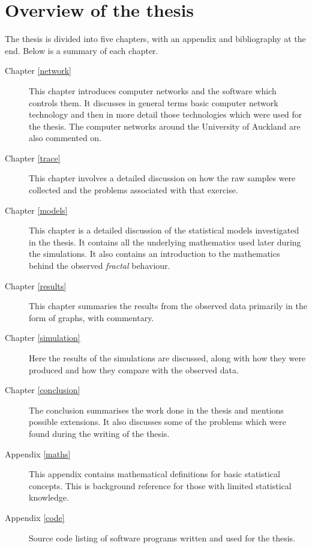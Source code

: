 \chapter{Overview of the thesis}

The thesis is divided into five chapters, with an appendix and
bibliography at the end.  Below is a summary of each chapter.

\begin{description}
\item[Chapter \ref{network}]
This chapter introduces computer networks and the software which
controls them.  It discusses in general terms basic computer network
technology and then in more detail those technologies which were used
for the thesis.  The computer networks around the University of
Auckland are also commented on.

\item[Chapter \ref{trace}]
This chapter involves a detailed discussion on how the raw samples
were collected and the problems associated with that exercise.

\item[Chapter \ref{models}]
This chapter is a detailed discussion of the statistical models
investigated in the thesis.  It contains all the underlying
mathematics used later during the simulations.  It also contains an
introduction to the mathematics behind the observed \emph{fractal}
behaviour.

\item[Chapter \ref{results}]
This chapter summaries the results from the observed data primarily in
the form of graphs, with commentary.

\item[Chapter \ref{simulation}]
Here the results of the simulations are discussed, along with how they
were produced and how they compare with the observed data.

\item[Chapter \ref{conclusion}]
The conclusion summarises the work done in the thesis and mentions
possible extensions.  It also discusses some of the problems which
were found during the writing of the thesis.

\item[Appendix \ref{maths}]
This appendix contains mathematical definitions for basic statistical
concepts.  This is background reference for those with limited
statistical knowledge.

\item[Appendix \ref{code}]
Source code listing of software programs written and used for the thesis.

\end{description}
